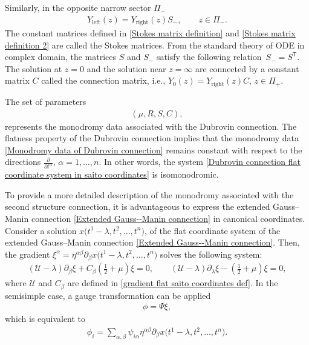 Similarly, in the opposite narrow sector $\Pi_{-}$
\begin{gather}\label{Stokes matrix definition 2}
 Y_{\text{left}}(z) = Y_{\text{right}}(z)S_{-}, \qquad z \in \Pi_{-}.
\end{gather}
The constant matrices defined in \eqref{Stokes matrix definition} and \eqref{Stokes matrix definition 2} are called the Stokes matrices. From the standard theory of ODE in complex domain, the matrices $S$ and $S_{-}$ satisfy the following relation~${
S_{-}=S^{\mathsf T}}$.
The solution at \(z=0\) and the solution near \(z=\infty\) are connected by a constant matrix \(C\) called the connection matrix, i.e.,
$Y_{0}(z) = Y_{\text{right}}(z)C$, $ z \in \Pi_{+}$.

The set of parameters
\begin{gather}\label{Monodromy data of Dubrovin connection}
 (\mu, R, S, C),
\end{gather}
represents the monodromy data associated with the Dubrovin connection. The flatness property of the Dubrovin connection implies that the monodromy data \eqref{Monodromy data of Dubrovin connection} remains constant with respect to the directions $\frac{\partial}{\partial t^{\alpha}}$, $\alpha=1, \dots, n$. In other words, the system \eqref{Dubrovin connection flat coordinate system in saito coordinates} is isomonodromic.

To provide a more detailed description of the monodromy associated with the second structure connection, it is advantageous to express the extended Gauss--Manin connection \eqref{Extended Gauss--Manin connection} in canonical coordinates. Consider a solution
$
 x\bigl(t^1-\lambda, t^2, \dots, t^n\bigr)$,
of the flat coordinate system of the extended Gauss--Manin connection \eqref{Extended Gauss--Manin connection}. Then, the gradient
${
 \xi^{\alpha} = \eta^{\alpha\beta}\partial_{\beta}x\bigl(t^1-\lambda, t^2, \dots, t^n\bigr)}
$
solves the following system:
\begin{gather}
 (\mathcal{U}-\lambda)\partial_{\beta}\xi + C_{\beta}\left(\frac{1}{2}+\mu\right)\xi = 0,\qquad
 (\mathcal{U}-\lambda)\partial_{\lambda}\xi - \left(\frac{1}{2}+\mu\right)\xi = 0,\label{Extended Gauss manin in matrix form flat Saito}
\end{gather}
where $\mathcal{U}$ and $C_{\beta}$ are defined in \eqref{gradient flat saito coordinates def}.
In the semisimple case, a gauge transformation can be applied
\begin{gather}\label{gauge transform canonical coordinate}
 \phi = \Psi\xi,
\end{gather}
which is equivalent to
\begin{gather}\label{gauge transform canonical coordinate part 2}
 \phi_i = \sum_{\alpha,\beta}\psi_{i\alpha}\eta^{\alpha\beta}\partial_{\beta}x\bigl(t^1-\lambda,t^2,\dots,t^n\bigr).
\end{gather}

